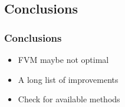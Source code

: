\subsection{Conclusions}

\begin{frame}[<+(1)->]
\frametitle{Conclusions}

\begin{itemize}
\item FVM maybe not optimal
\item A long list of improvements
\item Check for available methods
\end{itemize}

\end{frame}

